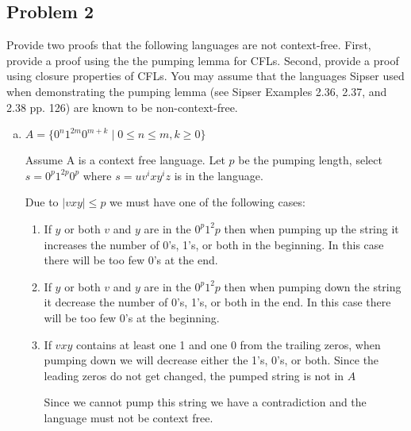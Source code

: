 \documentclass{article}
\begin{document}
    \newpage
    \subsection*{Problem 2}
    Provide two proofs that the following languages are not context-free. First, provide a proof
    using the the pumping lemma for CFLs. Second, provide a proof using closure properties of
    CFLs. You may assume that the languages Sipser used when demonstrating the pumping lemma
    (see Sipser Examples 2.36, 2.37, and 2.38 pp. 126) are known to be non-context-free.

    \begin{enumerate}[(a)]
    \item $A = \{ 0^n 1^{2m} 0^{m+k} \;|\; 0 \le n \le m, k \ge 0 \}$

    Assume A is a context free language.
    Let $p$ be the pumping length, select $s = 0^p1^{2p}0^p$ where $s = uv^ixy^iz$ is in the
    language.

    Due to $|vxy| \leq p$ we must have one of the following cases:

    \begin{enumerate}[{Case} 1:]

    \item

    If $y$ or both $v$ and $y$ are in the $0^p1^2p$ then when pumping up the string
    it increases the number of 0's, 1's, or both in the beginning. In this case there will be
    too few 0's at the end.

    \item

    If $y$ or both $v$ and $y$ are in the $0^p1^2p$ then when pumping down the string
    it decrease the number of 0's, 1's, or both in the end. In this case there will be
    too few 0's at the beginning.

    \item

    If $vxy$ contains at least one 1 and one 0 from the trailing zeros, when
    pumping down we will decrease either the 1's, 0's, or both. Since the leading
    zeros do not get changed, the pumped string is not in $A$ 

    Since we cannot pump this string we have a contradiction and the language
    must not be context free.

    \end{enumerate}




\end{enumerate}
\end{document}

